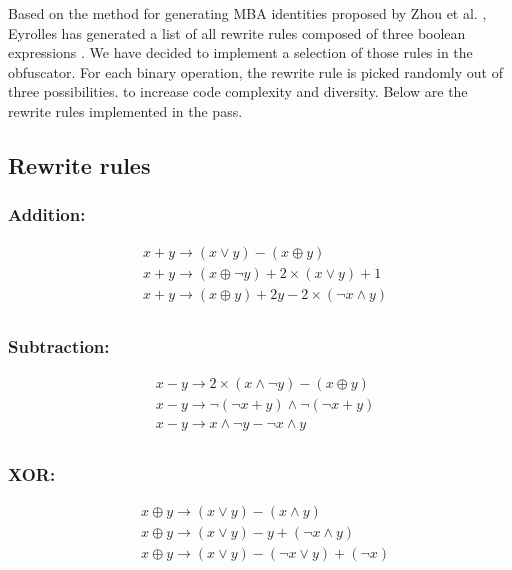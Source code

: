 \documentclass[
  digital, %
  table,   %
  twoside, %
  nolof,     %
  nolot,     %
]{fithesis3}
\theoremstyle{definition}
\begin{document}
Based on the method for generating MBA identities proposed by Zhou et al. \cite{mba_zhou}, Eyrolles has generated a list of all rewrite rules composed of three boolean expressions \cite{eyrollesMBAobf}. We have decided to implement a selection of those rules in the obfuscator. For each binary operation, the rewrite rule is picked randomly out of three possibilities. to increase code complexity and diversity. Below are the rewrite rules implemented in the pass.

\subsection{Rewrite rules}
\subsubsection{Addition:}
$$
\begin{aligned}
&x+y \rightarrow(x \vee y) - (x \oplus y) \\
&x+y \rightarrow(x \oplus \neg y)+ 2 \times( x \vee y) + 1 \\
&x+y \rightarrow(x \oplus y)+2 y-2 \times(\neg x \wedge y) \\
\end{aligned}
$$

\subsubsection{Subtraction:}
$$
\begin{aligned}
&x-y \rightarrow 2\times(x \wedge \neg y) - (x \oplus y) \\
& x - y \rightarrow \neg ( \neg x + y) \wedge \neg(\neg x + y) \\
& x - y \rightarrow x \wedge \neg y - \neg x \wedge y \\
\end{aligned}
$$

\subsubsection{XOR:}
$$
\begin{aligned}
&x \oplus y \rightarrow (x \vee y) - (x \wedge y) \\
&x \oplus y \rightarrow(x \vee y)-y+(\neg x \wedge y) \\
&x \oplus y \rightarrow(x \vee y)-(\neg x \vee y)+(\neg x) \\
\end{aligned}
$$
\end{document}
